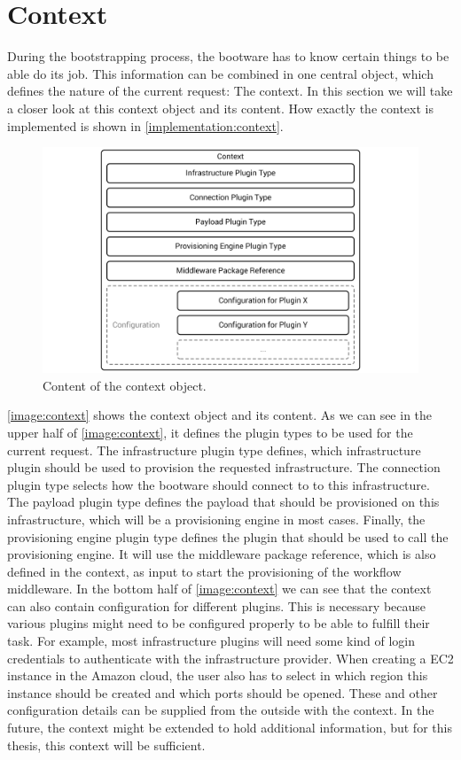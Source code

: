 \section{Context}
\label{design:context}

During the bootstrapping process, the bootware has to know certain things to be able do its job.
This information can be combined in one central object, which defines the nature of the current request: The context.
In this section we will take a closer look at this context object and its content.
How exactly the context is implemented is shown in \autoref{implementation:context}.

\begin{figure}[!htbp]
	\centering
	\includegraphics[resolution=600]{design/assets/context}
	\caption{Content of the context object.}
	\label{image:context}
\end{figure}

\autoref{image:context} shows the context object and its content.
As we can see in the upper half of \autoref{image:context}, it defines the plugin types to be used for the current request.
The infrastructure plugin type defines, which infrastructure plugin should be used to provision the requested infrastructure.
The connection plugin type selects how the bootware should connect to to this infrastructure.
The payload plugin type defines the payload that should be provisioned on this infrastructure, which will be a provisioning engine in most cases.
Finally, the provisioning engine plugin type defines the plugin that should be used to call the provisioning engine.
It will use the middleware package reference, which is also defined in the context, as input to start the provisioning of the workflow middleware.
In the bottom half of \autoref{image:context} we can see that the context can also contain configuration for different plugins.
This is necessary because various plugins might need to be configured properly to be able to fulfill their task.
For example, most infrastructure plugins will need some kind of login credentials to authenticate with the infrastructure provider.
When creating a EC2 instance in the Amazon cloud, the user also has to select in which region this instance should be created and which ports should be opened.
These and other configuration details can be supplied from the outside with the context.
In the future, the context might be extended to hold additional information, but for this thesis, this context will be sufficient.

